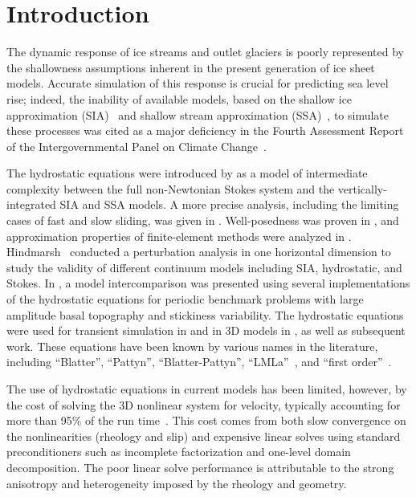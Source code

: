 \section{Introduction}
The dynamic response of ice streams and outlet glaciers is poorly represented by the shallowness
assumptions inherent in the present generation of ice sheet models.  Accurate simulation of this
response is crucial for predicting sea level rise; indeed, the inability of available models, based on
the shallow ice approximation (SIA)~\citep{hutter1983tgm} and shallow stream approximation
(SSA)~\citep{morland1987unconfined,weis1999theory}, to simulate these processes was cited as a major
deficiency in the Fourth Assessment Report of the Intergovernmental Panel on Climate Change~\citep{ipcc2007ar4-syr}.

The hydrostatic equations were introduced by \citet{blatter1995vas} as a model of intermediate complexity between the full non-Newtonian Stokes system and the vertically-integrated SIA and SSA models.
A more precise analysis, including the limiting cases of fast and slow sliding, was given in \citet{schoof2010thin}.
Well-posedness was proven in \citet{colinge1999strongly}, and approximation properties of finite-element methods were analyzed in \citet{glowinski2003approximation,chow2004finite}.
Hindmarsh~\cite{hindmarsh2004numerical} conducted a perturbation analysis in one horizontal dimension to study the validity of different continuum models including SIA, hydrostatic, and Stokes.
In \citet{pattyn2008beh}, a model intercomparison was presented using several implementations of the hydrostatic equations for periodic benchmark problems with large amplitude basal topography and stickiness variability.
The hydrostatic equations were used for transient simulation in \citet{pattyn2002tgr} and in 3D models in \citet{pattyn2003ntd}, as well as subsequent work.
These equations have been known by various names in the literature, including ``Blatter'', ``Pattyn'', ``Blatter-Pattyn'', ``LMLa''~\citep{hindmarsh2004numerical}, and ``first order''~\citep{greve2009dynamics}.

The use of hydrostatic equations in current models has been limited, however, by the cost of solving the 3D nonlinear system for velocity, typically accounting for more than 95\% of the run time~\citep{larour2012continental}.
This cost comes from both slow convergence on the
nonlinearities (rheology and slip) and expensive linear solves using standard preconditioners such
as incomplete factorization and one-level domain decomposition.  The poor linear solve performance is
attributable to the strong anisotropy and heterogeneity imposed by the rheology and geometry.

